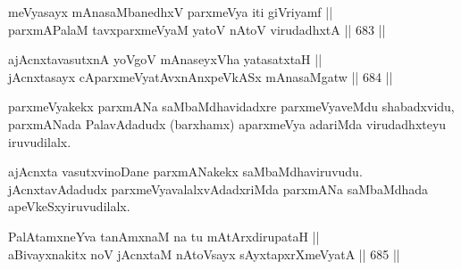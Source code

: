 
\begin{shl}
meVyasayx mAnasaMbanedhxV parxmeVya iti giVriyamf || \\
parxmAPalaM tavxparxmeVyaM yatoV nAtoV virudadhxtA \hfill || 683 ||  
\end{shl}
				
\begin{shl}
ajAcnxtavasutxnA yoVgoV mAnaseyxVha yatasatxtaH || \\
jAcnxtasayx cAparxmeVyatAvxnAnxpeVkASx mAnasaMgatw \hfill || 684 ||  
\end{shl}

\begin{artha} 
parxmeVyakekx parxmANa saMbaMdhavidadxre parxmeVyaveMdu shabadxvidu, parxmANada PalavAdadudx (barxhamx) aparxmeVya adariMda virudadhxteyu iruvudilalx.

ajAcnxta vasutxvinoDane parxmANakekx saMbaMdhaviruvudu. jAcnxtavAdadudx parxmeVyavalalxvAdadxriMda parxmANa saMbaMdhada apeVkeSxyiruvudilalx.
\end{artha}


\begin{shl}
PalAtamxneYva tanAmxnaM na tu mAtArxdirupataH || \\
aBivayxnakitx noV jAcnxtaM nAtoV\s sayx sAyxtapxrXmeVyatA \hfill || 685 ||  
\end{shl}

